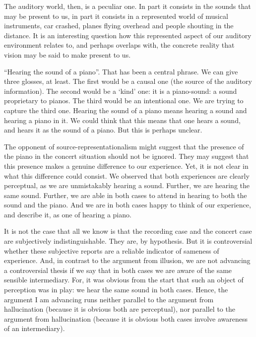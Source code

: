 \documentclass[sloppy, journal, git, bytitle, dodraft]{humapap}
\begin{document}
The auditory world, then, is a peculiar one. In part it consists in the sounds that may be present to us, in part it consists in a represented world of musical instruments, car crashed, planes flying overhead and people shouting in the distance. It is an interesting question how this represented aspect of our auditory environment relates to, and perhaps overlaps with, the concrete reality that vision may be said to make present to us. 

``Hearing the sound of a piano''. That has been a central phrase. We can give three glosses, at least. The first would be a causal one (the source of the auditory information). The second would be a `kind' one: it is a piano-sound: a sound proprietary to pianos. The third would be an intentional one. We are trying to capture the third one. Hearing the sound of a piano means hearing a sound and hearing a piano in it. We could think that this means that one hears a sound, and hears it as the sound of a piano. But this is perhaps unclear. 

The opponent of source-representationalism might suggest that the presence of the piano in the concert situation should not be ignored. They may suggest that this presence makes a genuine difference to our experience. Yet, it is not clear in what this difference could consist. We observed that both experiences are clearly perceptual, as we are unmistakably hearing a sound. Further, we are hearing the same sound. Further, we are able in both cases to attend in hearing to both the sound and the piano. And we are in both cases happy to think of our experience, and describe it, as one of hearing a piano. 

It is not the case that all we know is that the recording case and the concert case are subjectively indistinguishable. They are, by hypothesis. But it is controversial whether these subjective reports are a reliable indicator of sameness of experience. And, in contrast to the argument from illusion, we are not advancing a controversial thesis if we say that in both cases we are aware of the same sensible intermediary. For, it was obvious from the start that such an object of perception was in play: we hear the same sound in both cases. Hence, the argument I am advancing runs neither parallel to the argument from hallucination (because it is obvious both are perceptual), nor parallel to the argument from hallucination (because it is obvious both cases involve awareness of an intermediary). 

\end{document}
